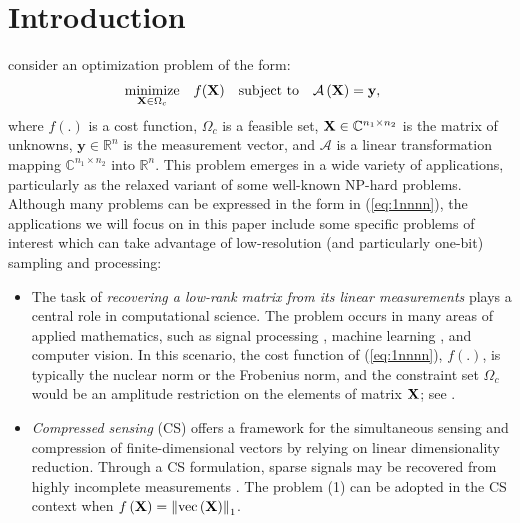 \documentclass[12pt,draftcls,onecolumn]{IEEEtran}
\begin{document}
\section{Introduction}
%
 consider an optimization problem of the form:
\begin{equation}
\label{eq:1nnnn}
\begin{aligned}
\underset{\mbX \in \Omega_{c}}{\textrm{minimize}}\quad f(\mbX)\quad
\text{subject to} \quad &\mathcal{A}\left(\mbX\right)=\mathbf{y},
\end{aligned}
\end{equation}\normalsize
where $f(.)$ is a cost function, $\Omega_{c}$ is a feasible set, $\mathbf{X}\in \mathbb{C}^{n_{1}\times n_{2}}$ is the matrix of unknowns, $\mathbf{y}\in \mathbb{R}^{n}$ is the measurement vector, and $\mathcal{A}$ is a linear transformation mapping $\mathbb{C}^{n_{1}\times n_{2}}$ into $\mathbb{R}^{n}$. This problem emerges in a wide variety of applications, particularly as the relaxed variant of some well-known NP-hard problems. Although many problems can be expressed in
the form in (\ref{eq:1nnnn}), the applications we will focus on in this paper
include some specific problems of interest which can take advantage of low-resolution (and particularly one-bit) sampling and processing:
\begin{itemize}
\item The task of \emph{recovering a low-rank matrix from its linear measurements} plays a central role in computational science. The problem occurs in many areas of applied mathematics, such as signal processing \cite{candes2015phase,cai2010singular,davenport20141,davenport2016overview,candes2011tight,chen2013low,li2019survey}, machine learning \cite{haeffele2014structured,nie2012low,blei2012probabilistic,obozinski2010joint,pontile2007convex,argyriou2006multi}, and computer vision\cite{tomasi1992shape}. In this scenario, the cost function of (\ref{eq:1nnnn}), $f(.)$, is typically the nuclear norm or the Frobenius norm, and the constraint set $\Omega_{c}$ would be an amplitude restriction on the elements of matrix $\mathbf{X}$; see \cite{recht2011null,cai2010singular}.
    \item \emph{Compressed sensing} (CS) offers a framework for the simultaneous sensing and compression
of finite-dimensional vectors by relying on linear dimensionality reduction. Through a CS formulation, sparse signals may be recovered from highly incomplete measurements \cite{candes2006robust,candes2006compressive,candes2008introduction}. The problem (1) can be adopted in the CS context when $f\left(\mathbf{X}\right)=\left\|\operatorname{vec}\left(\mathbf{X}\right)\right\|_{1}$.
\end{itemize}
\end{document}
